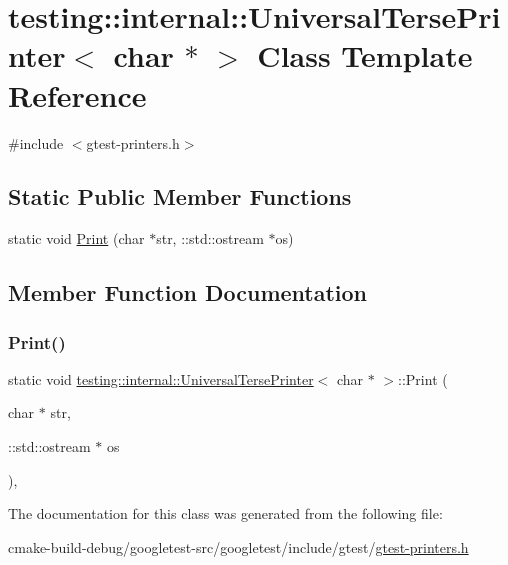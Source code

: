 \hypertarget{classtesting_1_1internal_1_1UniversalTersePrinter_3_01char_01_5_01_4}{}\section{testing\+::internal\+::Universal\+Terse\+Printer$<$ char $\ast$ $>$ Class Template Reference}
\label{classtesting_1_1internal_1_1UniversalTersePrinter_3_01char_01_5_01_4}


{\ttfamily \#include $<$gtest-\/printers.\+h$>$}

\subsection*{Static Public Member Functions}
\begin{DoxyCompactItemize}
\item 
static void \mbox{\hyperlink{classtesting_1_1internal_1_1UniversalTersePrinter_3_01char_01_5_01_4_aa9ef95587c1461fe33e254af52401a43}{Print}} (char $\ast$str, \+::std\+::ostream $\ast$os)
\end{DoxyCompactItemize}


\subsection{Member Function Documentation}
\mbox{\label{classtesting_1_1internal_1_1UniversalTersePrinter_3_01char_01_5_01_4_aa9ef95587c1461fe33e254af52401a43}} 
\subsubsection{\texorpdfstring{Print()}{Print()}}
{\footnotesize\ttfamily static void \mbox{\hyperlink{classtesting_1_1internal_1_1UniversalTersePrinter}{testing\+::internal\+::\+Universal\+Terse\+Printer}}$<$ char $\ast$ $>$\+::Print (\begin{DoxyParamCaption}\item[{char $\ast$}]{str,  }\item[{\+::std\+::ostream $\ast$}]{os }\end{DoxyParamCaption})\hspace{0.3cm}{\ttfamily [inline]}, {\ttfamily [static]}}



The documentation for this class was generated from the following file\+:\begin{DoxyCompactItemize}
\item 
cmake-\/build-\/debug/googletest-\/src/googletest/include/gtest/\mbox{\hyperlink{gtest-printers_8h}{gtest-\/printers.\+h}}\end{DoxyCompactItemize}
